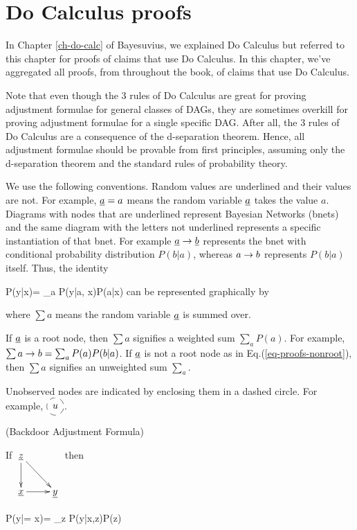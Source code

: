 \chapter{Do Calculus proofs}
\label{ch-do-calc-proofs}

In Chapter \ref{ch-do-calc}
of Bayesuvius,
we explained Do Calculus
but referred to this
chapter for proofs
of claims that
use Do Calculus.
In this chapter, we've
aggregated
 all proofs, from
throughout the book,
of claims that use Do Calculus.

Note that even though the 3
rules of Do Calculus
are great for proving
adjustment formulae
for general classes of DAGs,
they are sometimes overkill
for proving
 adjustment formulae
for a single specific DAG.
After all,  the
 3 rules of Do Calculus
are a consequence
of the d-separation theorem.
Hence, all adjustment
formulae should be
provable from first principles,
assuming only
the d-separation theorem
and the standard rules of
probability theory.

We use the
 following conventions.
Random values are underlined
and their values are not.
For example, ${\underline{a}}=a$ means
the random variable
${\underline{a}}$ takes the value $a$.
Diagrams
with nodes that are
underlined represent
Bayesian Networks (bnets)
and the same diagram
with the letters not underlined
represents a specific
instantiation of that bnet.
For example ${\underline{a}}\rightarrow{\underline{b}}$
represents the bnet with
conditional probability distribution
$P(b|a)$,
whereas  $a\rightarrow b$
represents $P(b|a)$ itself.
Thus, the identity

\beq
P(y|x)= \sum_a P(y|a, x)P(a|x)
\eeq
can be represented graphically
by

\beq
{}
\label{eq-proofs-nonroot}
\eeq
where $\sum a$
means the random variable
${\underline{a}}$ is summed over.

If ${\underline{a}}$ is a root node,
then $\sum a$ signifies
a weighted sum $\sum_a P(a)$. 
For example, $\sum a\rightarrow b=\sum_a P(a)P(b|a)$.
If ${\underline{a}}$ is not 
a root node
as in Eq.(\ref{eq-proofs-nonroot}), then 
$\sum a$ signifies
an unweighted sum $\sum_a$.

Unobserved nodes are
indicated by enclosing them
in a dashed circle. For example,
$\xymatrix{*++[F-o]{u}}$.

\begin{claim} (Backdoor
Adjustment Formula)
\label{cl-backdoor-proof}

If
$
\xymatrix{
{\rvz}\ar[d]\ar[rd]
\\
\rvx\ar[r]&\rvy
}$
then

\beq
P(y|\cald \rvx = x)=
\sum_z
P(y|x,z)P(z)
\eeq
\beq
{}
\eeq
\end{claim}

